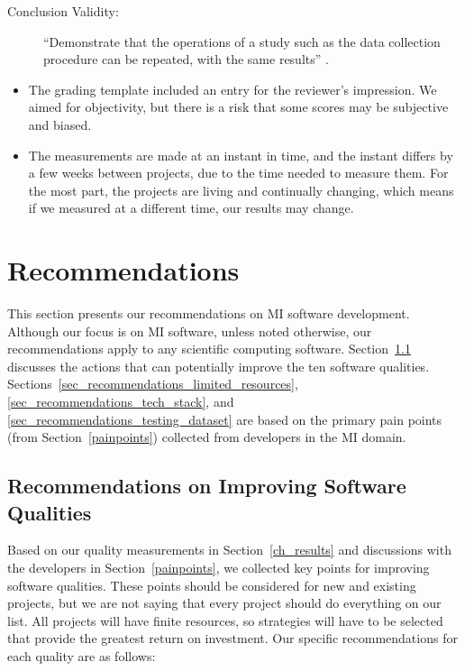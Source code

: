 \documentclass[final, 3p, times, authoryear]{elsarticle}
\begin{document}
\begin{description}
    \item[Conclusion Validity:] ``Demonstrate that the operations of a study
    such as the data collection procedure can be repeated, with the same
    results'' \citep{ZhouEtAl2016}.
\end{description}

\begin{itemize}
\item The grading template included an entry for the reviewer's impression.  We
aimed for objectivity, but there is a risk that some scores may be subjective
and biased.
\item The measurements are made at an instant in time, and the instant differs
by a few weeks between projects, due to the time needed to measure them. For the
most part, the projects are living and continually changing, which means if we
measured at a different time, our results may change.
\end{itemize}

\section{Recommendations} \label{ch_recommendations}

This section presents our recommendations on MI software development. Although
our focus is on MI software, unless noted otherwise, our recommendations apply
to any scientific computing software.
Section~\ref{sec_recommendations_qualities} discusses the actions that can
potentially improve the ten software qualities.
Sections~\ref{sec_recommendations_limited_resources},
\ref{sec_recommendations_tech_stack}, and
\ref{sec_recommendations_testing_dataset} are based on the primary pain points
(from Section~\ref{painpoints}) collected from developers in the
MI domain.

\subsection{Recommendations on Improving Software Qualities}
\label{sec_recommendations_qualities}

Based on our quality measurements in Section~\ref{ch_results} and discussions
with the developers in Section~\ref{painpoints}, we collected key points for
improving software qualities. These points should be considered for new and
existing projects, but we are not saying that every project should do everything
on our list.  All projects will have finite resources, so strategies will have
to be selected that provide the greatest return on investment.  Our specific
recommendations for each quality are as follows:
\end{document}
